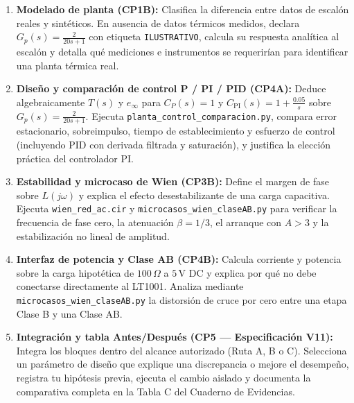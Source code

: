 \documentclass[11pt, a4paper]{article}
\begin{document}
\begin{enumerate}[label=\textbf{E\arabic*.}, start=0, leftmargin=*]
    \item \textbf{Modelado de planta (CP1B):} Clasifica la diferencia entre datos de escalón reales y sintéticos. En ausencia de datos térmicos medidos, declara $G_p(s) = \frac{2}{20s+1}$ con etiqueta \texttt{ILUSTRATIVO}, calcula su respuesta analítica al escalón y detalla qué mediciones e instrumentos se requerirían para identificar una planta térmica real.
    \item \textbf{Diseño y comparación de control P / PI / PID (CP4A):} Deduce algebraicamente $T(s)$ y $e_\infty$ para $C_P(s) = 1$ y $C_{\text{PI}}(s) = 1 + \frac{0.05}{s}$ sobre $G_p(s) = \frac{2}{20s+1}$. Ejecuta \texttt{planta\_control\_comparacion.py}, compara error estacionario, sobreimpulso, tiempo de establecimiento y esfuerzo de control (incluyendo PID con derivada filtrada y saturación), y justifica la elección práctica del controlador PI.
    \item \textbf{Estabilidad y microcaso de Wien (CP3B):} Define el margen de fase sobre $L(j\omega)$ y explica el efecto desestabilizante de una carga capacitiva. Ejecuta \texttt{wien\_red\_ac.cir} y \texttt{microcasos\_wien\_claseAB.py} para verificar la frecuencia de fase cero, la atenuación $\beta = 1/3$, el arranque con $A > 3$ y la estabilización no lineal de amplitud.
    \item \textbf{Interfaz de potencia y Clase AB (CP4B):} Calcula corriente y potencia sobre la carga hipotética de $100\,\Omega$ a $5\,\text{V}$ DC y explica por qué no debe conectarse directamente al LT1001. Analiza mediante \texttt{microcasos\_wien\_claseAB.py} la distorsión de cruce por cero entre una etapa Clase B y una Clase AB.
    \item \textbf{Integración y tabla Antes/Después (CP5 — Especificación V11):} Integra los bloques dentro del alcance autorizado (Ruta A, B o C). Selecciona un parámetro de diseño que explique una discrepancia o mejore el desempeño, registra tu hipótesis previa, ejecuta el cambio aislado y documenta la comparativa completa en la Tabla C del Cuaderno de Evidencias.
\end{enumerate}
\end{document}
